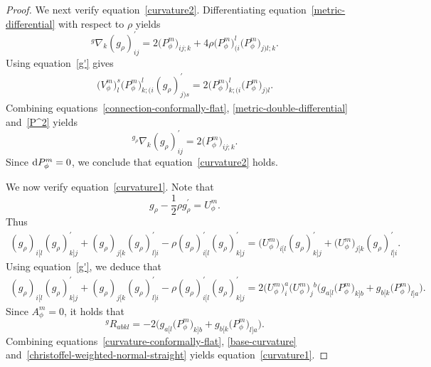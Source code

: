 \documentclass[10pt,a4paper]{amsart}
\numberwithin{equation}{section}
\begin{document}
\begin{proof}
We next verify equation~\eqref{curvature2}.
Differentiating equation~\eqref{metric-differential} with respect to $\rho$ yields
\begin{equation}
\label{metric-double-differential}
^{g}\nabla_{k} (g_\rho)_{i j}^{\prime}=2 \big(P_\phi^m\big)_{i j; k}+4 \rho \big(P_\phi^m\big)_{(i}^{l} \big(P_\phi^m\big)_{j) l; k}.
\end{equation}
Using equation~\eqref{g'} gives
\begin{align}
\label{P^2}
\big(V_\phi^m\big)_{l}^{s} \big(P_\phi^m\big)_{k;(i}^{l} (g_\rho)_{j) s}^{\prime}=2 \big(P_\phi^m\big)_{k;(i}^{l} \big(P_\phi^m\big)_{j) l}.
\end{align}
Combining equations~\eqref{connection-conformally-flat}, \eqref{metric-double-differential} and~\eqref{P^2} yields{\samepage
\[
{ }^{g_\rho} \nabla_{k} (g_\rho)_{i j}^{\prime}=2 \big(P_\phi^m\big)_{i j; k}.
\]
Since ${\rm d}P_\phi^m=0$, we conclude that equation~\eqref{curvature2} holds.}

We now verify equation~\eqref{curvature1}. Note that
\[
g_\rho-\frac{1}{2} \rho g_\rho^{\prime}=U_\phi^m.
\]
Thus
\begin{gather*}
(g_\rho)_{i[l} (g_\rho)_{k] j}^{\prime}+(g_\rho)_{j[k} (g_\rho)_{l] i}^{\prime}-\rho (g_\rho)_{i[l}^{\prime} (g_\rho)_{k] j}^{\prime}=\big(U_\phi^m\big)_{i[l} (g_\rho)_{k] j}^{\prime}+\big(U_\phi^m\big)_{j[k} (g_\rho)_{l] i}^{\prime}.
\end{gather*}
Using equation~\eqref{g'}, we deduce that
\begin{gather*}
(g_\rho)_{i[l} (g_\rho)_{k] j}^{\prime}+(g_\rho)_{j[k} (g_\rho)_{l] i}^{\prime}-\rho (g_\rho)_{i[l}^{\prime} (g_\rho)_{k] j}^{\prime}
=2 \big(U_\phi^m\big)_{i}^{a} \big(U_\phi^m\big)_{j}{ }^{b}\bigl(g_{a[l} \big(P_\phi^m\big)_{k] b}+g_{b[k} \big(P_\phi^m\big)_{l] a}\bigr).
\end{gather*}
Since $A_\phi^m=0$, it holds that
\begin{equation}
\label{base-curvature}
{ }^{g} R_{a b k l}=-2\big(g_{a[l} \big(P_\phi^m\big)_{k] b}+g_{b[k} \big(P_\phi^m\big)_{l] a}\big).
\end{equation}
Combining equations~\eqref{curvature-conformally-flat}, \eqref{base-curvature} and~\eqref{christoffel-weighted-normal-straight} yields equation~\eqref{curvature1}.
\end{proof}
\end{document}
